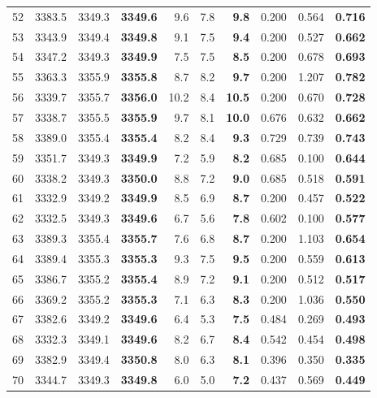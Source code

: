 \documentclass[a4paper,11pt]{article}
\begin{document}
\begin{longtable}{l rrr rrr rrr}
  52 & 3383.5 & 3349.3 & \textbf{3349.6} & 9.6 & 7.8 & \textbf{9.8} & 0.200 & 0.564 & \textbf{0.716} \\
  53 & 3343.9 & 3349.4 & \textbf{3349.8} & 9.1 & 7.5 & \textbf{9.4} & 0.200 & 0.527 & \textbf{0.662} \\
  54 & 3347.2 & 3349.3 & \textbf{3349.9} & 7.5 & 7.5 & \textbf{8.5} & 0.200 & 0.678 & \textbf{0.693} \\
  55 & 3363.3 & 3355.9 & \textbf{3355.8} & 8.7 & 8.2 & \textbf{9.7} & 0.200 & 1.207 & \textbf{0.782} \\
  56 & 3339.7 & 3355.7 & \textbf{3356.0} & 10.2 & 8.4 & \textbf{10.5} & 0.200 & 0.670 & \textbf{0.728} \\
  57 & 3338.7 & 3355.5 & \textbf{3355.9} & 9.7 & 8.1 & \textbf{10.0} & 0.676 & 0.632 & \textbf{0.662} \\
  58 & 3389.0 & 3355.4 & \textbf{3355.4} & 8.2 & 8.4 & \textbf{9.3} & 0.729 & 0.739 & \textbf{0.743} \\
  59 & 3351.7 & 3349.3 & \textbf{3349.9} & 7.2 & 5.9 & \textbf{8.2} & 0.685 & 0.100 & \textbf{0.644} \\
  60 & 3338.2 & 3349.3 & \textbf{3350.0} & 8.8 & 7.2 & \textbf{9.0} & 0.685 & 0.518 & \textbf{0.591} \\
  61 & 3332.9 & 3349.2 & \textbf{3349.9} & 8.5 & 6.9 & \textbf{8.7} & 0.200 & 0.457 & \textbf{0.522} \\
  62 & 3332.5 & 3349.3 & \textbf{3349.6} & 6.7 & 5.6 & \textbf{7.8} & 0.602 & 0.100 & \textbf{0.577} \\
  63 & 3389.3 & 3355.4 & \textbf{3355.7} & 7.6 & 6.8 & \textbf{8.7} & 0.200 & 1.103 & \textbf{0.654} \\
  64 & 3389.4 & 3355.3 & \textbf{3355.3} & 9.3 & 7.5 & \textbf{9.5} & 0.200 & 0.559 & \textbf{0.613} \\
  65 & 3386.7 & 3355.2 & \textbf{3355.4} & 8.9 & 7.2 & \textbf{9.1} & 0.200 & 0.512 & \textbf{0.517} \\
  66 & 3369.2 & 3355.2 & \textbf{3355.3} & 7.1 & 6.3 & \textbf{8.3} & 0.200 & 1.036 & \textbf{0.550} \\
  67 & 3382.6 & 3349.2 & \textbf{3349.6} & 6.4 & 5.3 & \textbf{7.5} & 0.484 & 0.269 & \textbf{0.493} \\
  68 & 3332.3 & 3349.1 & \textbf{3349.6} & 8.2 & 6.7 & \textbf{8.4} & 0.542 & 0.454 & \textbf{0.498} \\
  69 & 3382.9 & 3349.4 & \textbf{3350.8} & 8.0 & 6.3 & \textbf{8.1} & 0.396 & 0.350 & \textbf{0.335} \\
  70 & 3344.7 & 3349.3 & \textbf{3349.8} & 6.0 & 5.0 & \textbf{7.2} & 0.437 & 0.569 & \textbf{0.449} \\

\end{longtable}
\end{document}
